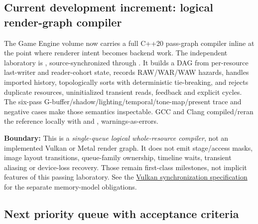 \subsection{Current development increment: logical render-graph compiler}\label{appendix-28e6f216fdc7-current-development-increment-logical-render-graph-compiler}

\hypertarget{appendix-28e6f216fdc7-current-development-increment-logical-render-graph-compiler}{}

The Game Engine volume now carries a full C++20 pass-graph compiler inline at the point where renderer intent becomes backend work. The independent laboratory is , source-synchronized through . It builds a DAG from per-resource last-writer and reader-cohort state, records RAW/WAR/WAW hazards, handles imported history, topologically sorts with deterministic tie-breaking, and rejects duplicate resources, uninitialized transient reads, feedback and explicit cycles. The six-pass G-buffer/shadow/lighting/temporal/tone-map/present trace and negative cases make those semantics inspectable. GCC and Clang compiled/reran the reference locally with  and , warnings-as-errors.

\textbf{Boundary:} This is a \emph{single-queue logical whole-resource compiler}, not an implemented Vulkan or Metal render graph. It does not emit stage/access masks, image layout transitions, queue-family ownership, timeline waits, transient aliasing or device-loss recovery. Those remain first-class milestones, not implicit features of this passing laboratory. See the \href{https://docs.vulkan.org/spec/latest/chapters/synchronization.html}{Vulkan synchronization specification} for the separate memory-model obligations.

\subsection{Next priority queue with acceptance criteria}\label{appendix-28e6f216fdc7-next-priority-queue-with-acceptance-criteria}

\hypertarget{appendix-28e6f216fdc7-next-priority-queue-with-acceptance-criteria}{}

